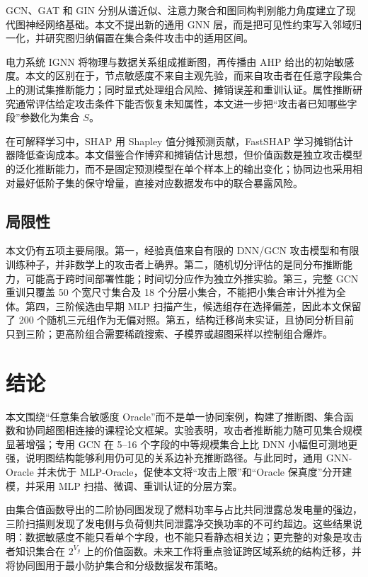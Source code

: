 \documentclass[UTF8,a4paper,zihao=5,fontset=fandol]{ctexart}
\begin{document}
GCN、GAT 和 GIN 分别从谱近似、注意力聚合和图同构判别能力角度建立了现代图神经网络基础\citep{kipf2017gcn,velickovic2018gat,xu2019gin}。本文不提出新的通用 GNN 层，而是把可见性约束写入邻域归一化，并研究图归纳偏置在集合条件攻击中的适用区间。

电力系统 IGNN 将物理与数据关系组成推断图，再传播由 AHP 给出的初始敏感度\citep{hu2026ignn}。本文的区别在于，节点敏感度不来自主观先验，而来自攻击者在任意字段集合上的测试集推断能力；同时显式处理组合风险、摊销误差和重训认证。属性推断研究通常评估给定攻击条件下能否恢复未知属性\citep{mehnaz2022sensitive}，本文进一步把“攻击者已知哪些字段”参数化为集合 $S$。

在可解释学习中，SHAP 用 Shapley 值分摊预测贡献\citep{lundberg2017shap}，FastSHAP 学习摊销估计器降低查询成本\citep{jethani2022fastshap}。本文借鉴合作博弈和摊销估计思想，但价值函数是独立攻击模型的泛化推断能力，而不是固定预测模型在单个样本上的输出变化；协同边也采用相对最好低阶子集的保守增量，直接对应数据发布中的联合暴露风险。

\subsection{局限性}

本文仍有五项主要局限。第一，经验真值来自有限的 DNN/GCN 攻击模型和有限训练种子，并非数学上的攻击者上确界。第二，随机切分评估的是同分布推断能力，可能高于跨时间部署性能；时间切分应作为独立外推实验。第三，完整 GCN 重训只覆盖 50 个宽尺寸集合及 18 个分层小集合，不能把小集合审计外推为全体。第四，三阶候选由早期 MLP 扫描产生，候选组存在选择偏差，因此本文保留了 200 个随机三元组作为无偏对照。第五，结构迁移尚未实证，且协同分析目前只到三阶；更高阶组合需要稀疏搜索、子模界或超图采样以控制组合爆炸\citep{berge1989hypergraphs}。

\section{结论}

本文围绕“任意集合敏感度 Oracle”而不是单一协同案例，构建了推断图、集合函数和协同超图相连接的课程论文框架。实验表明，攻击者推断能力随可见集合规模显著增强；专用 GCN 在 5--16 个字段的中等规模集合上比 DNN 小幅但可测地更强，说明图结构能够利用仍可见的关系边补充推断路径。与此同时，通用 GNN-Oracle 并未优于 MLP-Oracle，促使本文将“攻击上限”和“Oracle 保真度”分开建模，并采用 MLP 扫描、微调、重训认证的分层方案。

由集合值函数导出的二阶协同图发现了燃料功率与占比共同泄露总发电量的强边，三阶扫描则发现了发电侧与负荷侧共同泄露净交换功率的不可约超边。这些结果说明：数据敏感度不能只看单个字段，也不能只看静态相关边；更完整的对象是攻击者知识集合在 $2^{V_g}$ 上的价值函数。未来工作将重点验证跨区域系统的结构迁移，并将协同图用于最小防护集合和分级数据发布策略。
\end{document}
